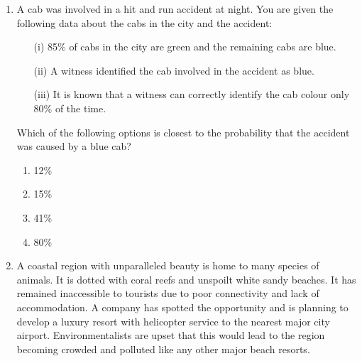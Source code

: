 \documentclass{article}
\begin{document}
\begin{enumerate}
Which of the following statements can be logically inferred from the above paragraph?
\begin{enumerate}
\item[(i)] Even as a junior cricketer, John was considered a good captain.
\item[(ii)] Finding a complete captain is a challenge.
\item[(iii)] Fans and the Cricket Board have differing views on what they want in a captain.
\item[(iv)] Over the past three seasons John has accumulated big scores.
\end{enumerate}
\begin{multicols}{4}
\begin{enumerate}
\item (i), (ii) and (iii) only
\item (iii) and (iv) only
\item (ii) and (iv) only
\item (i), (ii), (iii) and (iv)
\end{enumerate}
\end{multicols}

\item A cab was involved in a hit and run accident at night. You are given the following data about the cabs in the city and the accident:
\begin{enumerate}
\item[(i)] 85\% of cabs in the city are green and the remaining cabs are blue.
\item[(ii)] A witness identified the cab involved in the accident as blue.
\item[(iii)] It is known that a witness can correctly identify the cab colour only 80\% of the time.
\end{enumerate}
Which of the following options is closest to the probability that the accident was caused by a blue cab?
\begin{multicols}{4}
\begin{enumerate}
\item 12\%
\item 15\%
\item 41\%
\item 80\%
\end{enumerate}
\end{multicols}

\item A coastal region with unparalleled beauty is home to many species of animals. It is dotted with coral reefs and unspoilt white sandy beaches. It has remained inaccessible to tourists due to poor connectivity and lack of accommodation. A company has spotted the opportunity and is planning to develop a luxury resort with helicopter service to the nearest major city airport. Environmentalists are upset that this would lead to the region becoming crowded and polluted like any other major beach resorts.


\end{enumerate}
\end{document}

